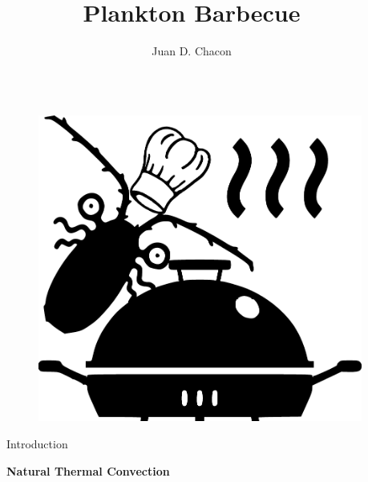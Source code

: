 \documentclass[final]{beamer}
\title{Plankton Barbecue} %
\author{Juan D. Chacon} %
\institute{Simon Fraser University Spring 2019} %
\newlength{\sepwid}
\newlength{\onecolwid}
\begin{document}

\setlength{\belowcaptionskip}{2ex} %
\setlength\belowdisplayshortskip{2ex} %

\begin{frame}[t] %

\begin{columns}[t] %

\begin{column}{\sepwid}\end{column} %

\begin{column}{\onecolwid} %

\begin{figure}
\includegraphics[width=0.45\linewidth]{images/planktonBBQRCropped.pdf}
\end{figure}


\begin{block}{Introduction}

\textbf{Natural Thermal Convection}


\end{block}
\end{column}
\end{columns}
\end{frame}
\end{document}
